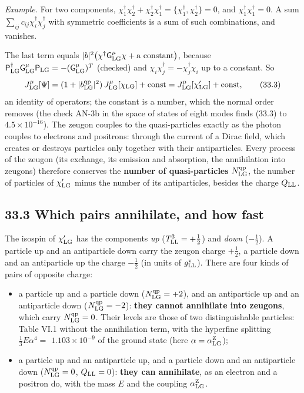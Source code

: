 \documentclass[
  10pt,
]{article}
\providecommand{\tightlist}{%
  \setlength{\itemsep}{0pt}\setlength{\parskip}{0pt}}
\begin{document}
\emph{Example.} For two components,
\(\chi_1^\dagger\chi_2^\dagger+\chi_2^\dagger\chi_1^\dagger=\{\chi_1^\dagger,\chi_2^\dagger\}=0\),
and \(\chi_1^\dagger\chi_1^\dagger=0\). A sum
\(\sum_{ij}c_{ij}\chi_i^\dagger\chi_j^\dagger\) with symmetric
coefficients is a sum of such combinations, and vanishes.

The last term equals
\(\lvert b\rvert^2\big(\chi^\dagger\mathsf G^\mu_{\rm LG}\chi+\text{a constant}\big)\),
because
\(\mathsf P_{\rm LG}^\dagger\mathsf G^\mu_{\rm LG}\mathsf P_{\rm LG}=-(\mathsf G^\mu_{\rm LG})^T\)
(checked) and \(\chi_i\chi_j^\dagger=-\chi_j^\dagger\chi_i\) up to a
constant. So
\[J^\mu_{\rm LG}[\Psi]=(1+\lvert b^{\rm qp}_{\rm LG}\rvert^2)\,J^\mu_{\rm LG}[\chi_{\rm LG}]+\text{const}=J^\mu_{\rm LG}[\chi'_{\rm LG}]+\text{const},\tag{33.3}\]
an identity of operators; the constant is a number, which the normal
order removes (the check AN-3b in the space of states of eight modes
finds (33.3) to \(4.5\times10^{-16}\)). The zeugon couples to the
quasi-particles exactly as the photon couples to electrons and
positrons: through the current of a Dirac field, which creates or
destroys particles only together with their antiparticles. Every process
of the zeugon (its exchange, its emission and absorption, the
annihilation into zeugons) therefore conserves the \textbf{number of
quasi-particles} \(N^{\rm qp}_{\rm LG}\), the number of particles of
\(\chi'_{\rm LG}\) minus the number of its antiparticles, besides the
charge \(Q_{\rm LL}\).

\hypertarget{which-pairs-annihilate-and-how-fast}{%
\subsection{33.3 Which pairs annihilate, and how
fast}\label{which-pairs-annihilate-and-how-fast}}

The isospin of \(\chi'_{\rm LG}\) has the components \emph{up}
(\(T^3_{\rm LL}=+\tfrac12\)) and \emph{down} (\(-\tfrac12\)). A particle
up and an antiparticle down carry the zeugon charge \(+\tfrac12\), a
particle down and an antiparticle up the charge \(-\tfrac12\) (in units
of \(g^{\rm v}_{\rm LL}\)). There are four kinds of pairs of opposite
charge:

\begin{itemize}
\tightlist
\item
  a particle up and a particle down (\(N^{\rm qp}_{\rm LG}=+2\)), and an
  antiparticle up and an antiparticle down (\(N^{\rm qp}_{\rm LG}=-2\)):
  \textbf{they cannot annihilate into zeugons}, which carry
  \(N^{\rm qp}_{\rm LG}=0\). Their levels are those of two
  distinguishable particles: Table VI.1 without the annihilation term,
  with the hyperfine splitting \(\tfrac13E\alpha^4=\)
  \(1.103\times10^{-9}\) of the ground state (here
  \(\alpha=\alpha^{\rm Z}_{\rm LG}\));
\item
  a particle up and an antiparticle up, and a particle down and an
  antiparticle down (\(N^{\rm qp}_{\rm LG}=0\), \(Q_{\rm LL}=0\)):
  \textbf{they can annihilate}, as an electron and a positron do, with
  the mass \(E\) and the coupling \(\alpha^{\rm Z}_{\rm LG}\).
\end{itemize}
\end{document}
